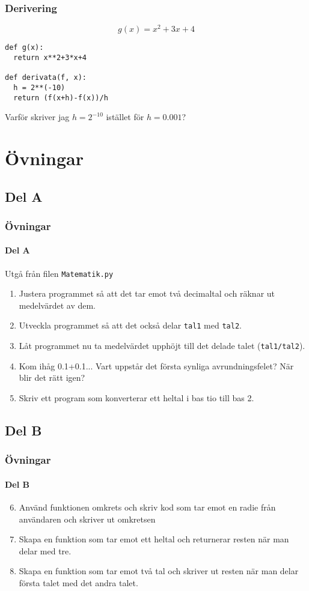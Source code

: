 \documentclass[aspectratio=169]{beamer}
\begin{document}
\begin{frame}[fragile]
	\frametitle{Derivering}

	\[g(x)=x^2+3x+4\]
	
	\begin{lstlisting}
def g(x):
  return x**2+3*x+4
  
def derivata(f, x):
  h = 2**(-10)
  return (f(x+h)-f(x))/h
	\end{lstlisting}
	
	Varför skriver jag \(h=2^{-10}\) istället för \(h=0.001\)?

\end{frame}

\section{Övningar}

\subsection{Del A}

\begin{frame}
	\frametitle{Övningar}
	\framesubtitle{Del A}
	
	Utgå från filen \lstinline{Matematik.py}
	
	\begin{enumerate}
		\item Justera programmet så att det tar emot två decimaltal och räknar ut medelvärdet av dem.
		\item Utveckla programmet så att det också delar \lstinline{tal1} med \lstinline{tal2}.
		\item Låt programmet nu ta medelvärdet upphöjt till det delade talet (\lstinline{tal1/tal2}).
		\item Kom ihåg 0.1+0.1... Vart uppstår det första synliga avrundningsfelet? När blir det rätt igen?
		\item Skriv ett program som konverterar ett heltal i bas tio till bas 2.
	\end{enumerate}

\end{frame}

\subsection{Del B}

\begin{frame}
	\frametitle{Övningar}
	\framesubtitle{Del B}
	
	\begin{enumerate}
		\setcounter{enumi}{5}
		\item Använd funktionen omkrets och skriv kod som tar emot en radie från användaren och skriver ut omkretsen
		\item Skapa en funktion som tar emot ett heltal och returnerar resten när man delar med tre.
		\item Skapa en funktion som tar emot två tal och skriver ut resten när man delar första talet med det andra talet.
	\end{enumerate}

\end{frame}
\end{document}
